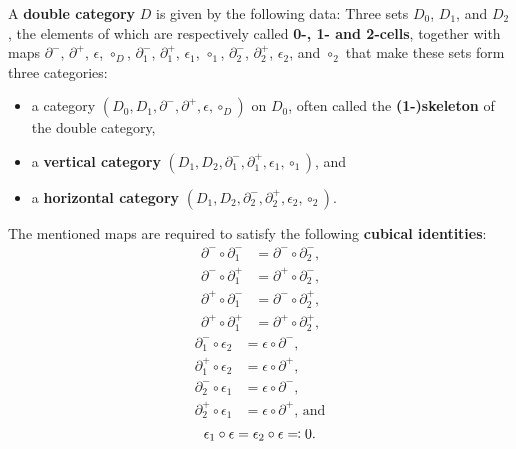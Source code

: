 \begin{defn} \label{def:dbl-cat}
A \textbf{double category} $D$ is given by the following data:
Three sets $D_0$, $D_1$, and $D_2$, the elements of which are
respectively called \textbf{0-, 1- and 2-cells}, together with
maps $\partial^-$, $\partial^+$, $\epsilon$, $\circ_D$,
$\partial^-_1$, $\partial^+_1$, $\epsilon_1$, $\circ_1$,
$\partial^-_2$, $\partial^+_2$, $\epsilon_2$, and $\circ_2$
that make these sets form three categories:
\begin{itemize}
\item a category $(D_0, D_1, \partial^-, \partial^+, \epsilon, \circ_D)$ 
on $D_0$, often called the \textbf{(1-)skeleton} of the double category,
\item a \textbf{vertical category}
$(D_1, D_2, \partial^-_1, \partial^+_1, \epsilon_1, \circ_1)$, and
\item a \textbf{horizontal category}
$(D_1, D_2, \partial^-_2, \partial^+_2, \epsilon_2, \circ_2)$.
\end{itemize}

The mentioned maps are required to satisfy the following \textbf{cubical
identities}:
\begin{equation} \label{eq:corner-ident}
\begin{aligned}
\partial^- \circ \partial^-_1 &= \partial^- \circ \partial^-_2\text{,} \\
\partial^- \circ \partial^+_1 &= \partial^+ \circ \partial^-_2\text{,} \\
\partial^+ \circ \partial^-_1 &= \partial^- \circ \partial^+_2\text{,} \\
\partial^+ \circ \partial^+_1 &= \partial^+ \circ \partial^+_2\text{,}
\end{aligned}
\end{equation}
\begin{equation} \label{eq:degen-ident}
\begin{aligned}
\partial^-_1 \circ \epsilon_2 &= \epsilon \circ \partial^-\text{,} \\
\partial^+_1 \circ \epsilon_2 &= \epsilon \circ \partial^+\text{,} \\
\partial^-_2 \circ \epsilon_1 &= \epsilon \circ \partial^-\text{,} \\
\partial^+_2 \circ \epsilon_1 &= \epsilon \circ \partial^+\text{, and}
\end{aligned}
\end{equation}
\begin{equation} \label{eq:zero-unique-ident}
\epsilon_1 \circ \epsilon = \epsilon_2 \circ \epsilon \eqqcolon 0\text{.}	 \\
\end{equation}


\end{defn}
